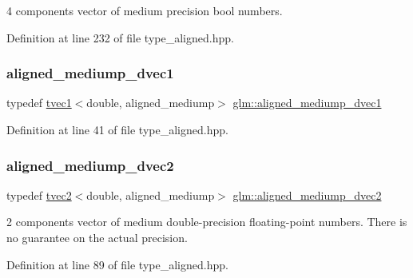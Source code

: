 4 components vector of medium precision bool numbers. 



Definition at line 232 of file type\+\_\+aligned.\+hpp.

\mbox{\label{group__gtc__type__aligned_gab12565fd290bac410edac30213fef31e}} 
\subsubsection{\texorpdfstring{aligned\_mediump\_dvec1}{aligned\_mediump\_dvec1}}
{\footnotesize\ttfamily typedef \mbox{\hyperlink{structglm_1_1tvec1}{tvec1}}$<$double, aligned\+\_\+mediump$>$ \mbox{\hyperlink{group__gtc__type__aligned_gab12565fd290bac410edac30213fef31e}{glm\+::aligned\+\_\+mediump\+\_\+dvec1}}}



Definition at line 41 of file type\+\_\+aligned.\+hpp.

\mbox{\label{group__gtc__type__aligned_ga7b8277f7fd1d4c9d824685d12080db4f}} 
\subsubsection{\texorpdfstring{aligned\_mediump\_dvec2}{aligned\_mediump\_dvec2}}
{\footnotesize\ttfamily typedef \mbox{\hyperlink{structglm_1_1tvec2}{tvec2}}$<$double, aligned\+\_\+mediump$>$ \mbox{\hyperlink{group__gtc__type__aligned_ga7b8277f7fd1d4c9d824685d12080db4f}{glm\+::aligned\+\_\+mediump\+\_\+dvec2}}}

2 components vector of medium double-\/precision floating-\/point numbers. There is no guarantee on the actual precision. 

Definition at line 89 of file type\+\_\+aligned.\+hpp.

\mbox{\label{group__gtc__type__aligned_ga1ba09491d449d986ea0d63172e96a598}} 
